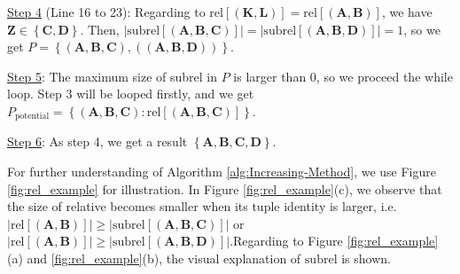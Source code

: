 \begin{example}
\uline{Step 4} (Line 16 to 23): Regarding to $\mathrm{rel}\left[\left(\boldsymbol{K},\boldsymbol{L}\right)\right]=\mathrm{rel}\left[\left(\boldsymbol{A},\boldsymbol{B}\right)\right]$,
we have $\boldsymbol{Z}\in\left\{ \boldsymbol{C},\boldsymbol{D}\right\} $.
Then, $\left|\mathrm{subrel}\left[\left(\boldsymbol{A},\boldsymbol{B},\boldsymbol{C}\right)\right]\right|=\left|\mathrm{subrel}\left[\left(\boldsymbol{A},\boldsymbol{B},\boldsymbol{D}\right)\right]\right|=1$,
so we get $P=\left\{ \left(\boldsymbol{A},\boldsymbol{B},\boldsymbol{C}\right),\left(\left(\boldsymbol{A},\boldsymbol{B},\boldsymbol{D}\right)\right)\right\} $.

\uline{Step 5}: The maximum size of subrel in $P$ is larger than
$0$, so we proceed the while loop. Step 3 will be looped firstly,
and we get $P_{\mathrm{potential}}=\left\{ \left(\boldsymbol{A},\boldsymbol{B},\boldsymbol{C}\right):\mathrm{rel}\left[\left(\boldsymbol{A},\boldsymbol{B},\boldsymbol{C}\right)\right]\right\} $.

\uline{Step 6}: As step 4, we get a result $\left\{ \boldsymbol{A},\boldsymbol{B},\boldsymbol{C},\boldsymbol{D}\right\} $.
\end{example}
%
\begin{example}
For further understanding of Algorithm \ref{alg:Increasing-Method},
we use Figure \ref{fig:rel_example} for illustration. In Figure \ref{fig:rel_example}(c),
we observe that the size of relative becomes smaller when its tuple
identity is larger, i.e. $\left|\mathrm{rel}\left[\left(\boldsymbol{A},\boldsymbol{B}\right)\right]\right|\geq\left|\mathrm{subrel}\left[\left(\boldsymbol{A},\boldsymbol{B},\boldsymbol{C}\right)\right]\right|$
or $\left|\mathrm{rel}\left[\left(\boldsymbol{A},\boldsymbol{B}\right)\right]\right|\geq\left|\mathrm{subrel}\left[\left(\boldsymbol{A},\boldsymbol{B},\boldsymbol{D}\right)\right]\right|$.Regarding
to Figure \ref{fig:rel_example}(a) and \ref{fig:rel_example}(b),
the visual explanation of $\mathrm{subrel}$ is shown.
\end{example}
